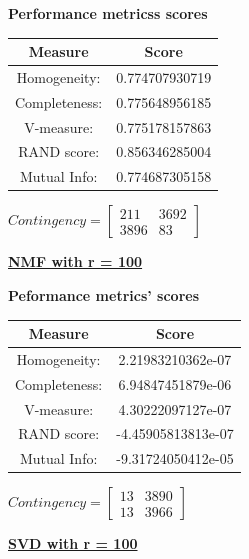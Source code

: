 \documentclass{report}
\begin{document}
\begin{center}
	\textbf{Performance metricss scores} \\ \vspace{10pt}	
	\begin{tabular}{*{2}{c}}
		\toprule
		\textbf{Measure} & \textbf{Score} \\
		\midrule		
		Homogeneity: & 0.774707930719  \\
		\midrule
		Completeness: & 0.775648956185 \\
		\midrule
		V-measure: & 0.775178157863 \\
		\midrule
		RAND score: & 0.856346285004 \\
		\midrule
		Mutual Info: & 0.774687305158 \\
		\bottomrule
	\end{tabular}
	\qquad
	$Contingency = \left[\begin{array}{*{2}{c}}
		211  & 3692 \\
		3896 & 83
			\end{array}\right]
		$
\end{center}


\underline{\textbf{NMF with r = 100}} \\

\begin{center}
	\textbf{Peformance metrics' scores} \\ \vspace{10pt}	
	\begin{tabular}{*{2}{c}}
		\toprule
		\textbf{Measure} & \textbf{Score} \\
		\midrule
		Homogeneity: & 2.21983210362e-07 \\
		\midrule
		Completeness: & 6.94847451879e-06 \\
		\midrule
		V-measure: & 4.30222097127e-07 \\
		\midrule
		RAND score: & -4.45905813813e-07 \\
		\midrule
		Mutual Info: & -9.31724050412e-05  \\
		\bottomrule
	\end{tabular}
	\qquad	
	$Contingency = \left[\begin{array}{*{2}{c}}
		13 	& 3890 \\
		13 	& 3966 
			\end{array} \right]
		$
\end{center}


\underline{\textbf{SVD with r = 100}} \\
\end{document}
